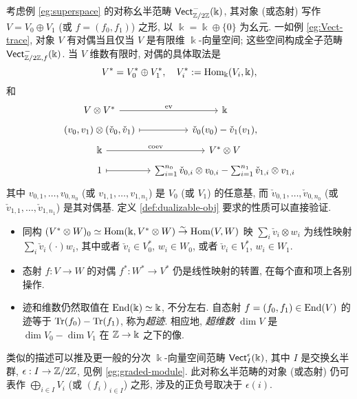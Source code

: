 \begin{example}\label{eg:superVect-trace}
	考虑例 \ref{eg:superspace} 的对称幺半范畴 $\mathsf{Vect}^-_{\mathbb{Z}/2\mathbb{Z}}(\Bbbk)$, 其对象 (或态射) 写作 $V = V_0 \oplus V_1$ (或 $f = (f_0, f_1)$) 之形, 以 $\Bbbk = \Bbbk \oplus \{0\}$ 为幺元. 一如例 \ref{eg:Vect-trace}, 对象 $V$ 有对偶当且仅当 $V$ 是有限维 $\Bbbk$-向量空间; 这些空间构成全子范畴 $\mathsf{Vect}^-_{\mathbb{Z}/2\mathbb{Z}, f}(\Bbbk)$. 当 $V$ 维数有限时, 对偶的具体取法是
	\[	V^* = V^*_0 \oplus V^*_1, \quad V^*_i := \operatorname{Hom}_{\Bbbk}(V_i, \Bbbk), \]
	和
	\[\begin{tikzcd}[row sep=tiny, column sep=small]
		V \otimes V^* \arrow[r, "{\mathrm{ev}}"] & \Bbbk \\
		(v_0, v_1) \otimes (\check{v}_0, \check{v}_1) \arrow[mapsto, r] & \check{v}_0(v_0) - \check{v}_1(v_1), \\
		\Bbbk \arrow[r, "{\mathrm{coev}}"] & V^* \otimes V \\
		1 \arrow[mapsto, r] & \sum_{i=1}^{n_0} \check{v}_{0,i} \otimes v_{0,i} - \sum_{i=1}^{n_1} \check{v}_{1,i} \otimes v_{1,i}
	\end{tikzcd}\]
	其中 $v_{0,1}, \ldots, v_{0, n_0}$ (或 $v_{1,1}, \ldots, v_{1, n_1}$) 是 $V_0$ (或 $V_1$) 的任意基, 而 $\check{v}_{0,1}, \ldots, \check{v}_{0, n_0}$ (或 $\check{v}_{1,1}, \ldots, \check{v}_{1, n_1}$) 是其对偶基. 定义 \ref{def:dualizable-obj} 要求的性质可以直接验证.
	\begin{itemize}
		\item 同构 $(V^* \otimes W)_0 \simeq \operatorname{Hom}(\Bbbk, V^* \otimes W) \stackrel{\sim}{\rightarrow} \operatorname{Hom}(V, W)$ 映 $\sum_i \check{v}_i \otimes w_i$ 为线性映射 $\sum_i \check{v}_i(\cdot) w_i$, 其中或者 $\check{v}_i \in V^*_0$, $w_i \in W_0$, 或者 $\check{v}_i \in V^*_1$, $w_i \in W_1$.
		\item 态射 $f: V \to W$ 的对偶 $f^*: W^* \to V^*$ 仍是线性映射的转置, 在每个直和项上各别操作.
		\item 迹和维数仍然取值在 $\operatorname{End}(\Bbbk) \simeq \Bbbk$, 不分左右. 自态射 $f = (f_0, f_1) \in \operatorname{End}(V)$ 的迹等于 $\operatorname{Tr}(f_0) - \operatorname{Tr}(f_1)$, 称为\emph{超迹}. 相应地, \emph{超维数} $\dim V$ 是 $\dim V_0 - \dim V_1$ 在 $\mathbb{Z} \to \Bbbk$ 之下的像.
	\end{itemize}
	
	类似的描述可以推及更一般的分次 $\Bbbk$-向量空间范畴 $\mathsf{Vect}^\epsilon_I(\Bbbk)$, 其中 $I$ 是交换幺半群, $\epsilon: I \to \mathbb{Z}/2\mathbb{Z}$, 见例 \ref{eg:graded-module}. 此对称幺半范畴的对象 (或态射) 仍可表作 $\bigoplus_{i \in I} V_i$ (或 $(f_i)_{i \in I}$) 之形, 涉及的正负号取决于 $\epsilon(i)$.
\end{example}


